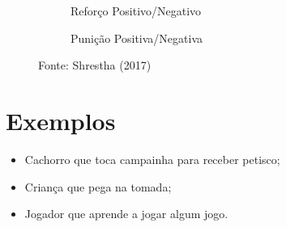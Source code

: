\documentclass{article}
\begin{document}
                \begin{figure}[ht]
                    \centering
                    \begin{subfigure}[b]{.45\textwidth}
                        \centering
                        \caption{Reforço Positivo/Negativo}
                    \end{subfigure}
                    \begin{subfigure}[b]{.45\textwidth}
                        \centering
                        \caption{Punição Positiva/Negativa}
                    \end{subfigure}
                    \caption{Fonte: Shrestha (2017)}
                    \label{fig:reforco-punicao}
                \end{figure}
            
    \section{Exemplos}
    
        \begin{itemize}
            \item Cachorro que toca campainha para receber petisco;
            \item Criança que pega na tomada;
            \item Jogador que aprende a jogar algum jogo.
        \end{itemize}
            
\end{document}
